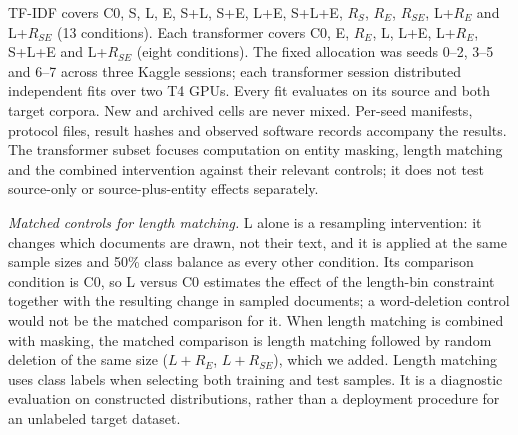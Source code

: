 TF-IDF covers C0, S, L, E, S+L, S+E, L+E, S+L+E, $R_S$, $R_E$, $R_{SE}$, L+$R_E$ and L+$R_{SE}$ (13 conditions). Each transformer covers C0, E, $R_E$, L, L+E, L+$R_E$, S+L+E and L+$R_{SE}$ (eight conditions). The fixed allocation was seeds 0--2, 3--5 and 6--7 across three Kaggle sessions; each transformer session distributed independent fits over two T4 GPUs. Every fit evaluates on its source and both target corpora. New and archived cells are never mixed. Per-seed manifests, protocol files, result hashes and observed software records accompany the results. The transformer subset focuses computation on entity masking, length matching and the combined intervention against their relevant controls; it does not test source-only or source-plus-entity effects separately.

\emph{Matched controls for length matching.} L alone is a resampling intervention: it changes which documents are drawn, not their text, and it is applied at the same sample sizes and 50\% class balance as every other condition. Its comparison condition is C0, so L versus C0 estimates the effect of the length-bin constraint together with the resulting change in sampled documents; a word-deletion control would not be the matched comparison for it. When length matching is combined with masking, the matched comparison is length matching followed by random deletion of the same size ($L{+}R_E$, $L{+}R_{SE}$), which we added. Length matching uses class labels when selecting both training and test samples. It is a diagnostic evaluation on constructed distributions, rather than a deployment procedure for an unlabeled target dataset.

